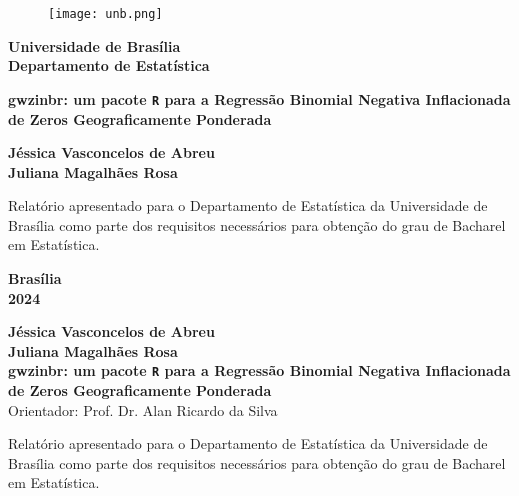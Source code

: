 \documentclass[12pt, a4paper, twoside]{report}
\numberwithin{equation}{section} %
\newcommand{\titulo}{gwzinbr: um pacote \texttt{R} para a Regressão Binomial Negativa Inflacionada de Zeros Geograficamente Ponderada}
\newcommand{\autor}{Jéssica Vasconcelos de Abreu\\Juliana Magalhães Rosa}
\newcommand{\orientador}{ Prof. Dr. Alan Ricardo da Silva}
\newcommand{\coorientador}{ Prof(a). }
\begin{document}
\begin{titlepage}
\begin{center}
\begin{figure}[h!]
	\centering
		\texttt{[image: unb.png]}
	\label{fig:unb}
\end{figure}
{\bf Universidade de Brasília \\
\bf Departamento de Estatística}
\vspace{5cm}

\setcounter{page}{0}
\null
\textbf{\titulo}
\vspace{2.5cm}


\vspace{0.2cm}
\textbf{\autor}
\end{center}
\vspace{1.5cm}

\begin{flushright}
\begin{minipage}{7.5cm}
\parbox[t]{7.5cm}{Relatório apresentado para o Departamento de Estatística da Universidade de Brasília como parte dos requisitos necessários para obtenção do grau de Bacharel em Estatística.}
\end{minipage}
\end{flushright}

\vspace{5cm}

\begin{center}
{\bf{Brasília} \\ }
\bf{2024}
\end{center}

\end{titlepage}

\thispagestyle{empty}

\begin{center}
\textbf{\autor} \\
\vspace{5cm}
\textbf{\titulo} \\
\vspace{3cm}
\small
Orientador: \orientador
\end{center}


\vspace*{3cm}

\begin{flushright}
\begin{minipage}{7.5cm}
 \parbox[t]{7.5cm}{Relatório apresentado para o Departamento de Estatística da Universidade de Brasília como parte dos requisitos necessários para obtenção do grau de Bacharel em Estatística.}
\end{minipage}
\end{flushright}
\end{document}
